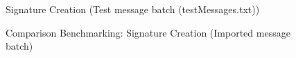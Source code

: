 \documentclass[]{final_report}
\theoremstyle{definition}
\begin{document}
\begin{figure}[H]
    \centering %
    
    \begin{minipage}{0.4\textwidth}
        \centering
        \caption{Signature Creation (Test message batch (testMessages.txt))}
        \label{fig:image1}
    \end{minipage}
    \hfill %
    \begin{minipage}{0.58\textwidth}
        \centering
        \caption{Comparison Benchmarking: Signature Creation (Imported message batch)}
        \label{fig:image2}
    \end{minipage}
\end{figure}
\end{document}
